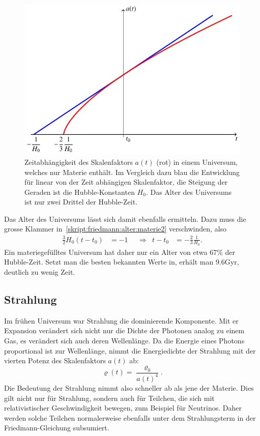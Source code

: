 \begin{figure}
\centering
\includegraphics{chapters/tikz/friedmann-materie.pdf}
\caption{Zeitabhängigkeit des Skalenfaktors $a(t)$ ({\color{red}rot})
in einem Universum, welches nur Materie enthält.
Im Vergleich dazu {\color{blue}blau} die Entwicklung für linear von der
Zeit abhängigen Skalenfaktor, die Steigung der Geraden ist die
Hubble-Konstanten $H_0$.
Das Alter des Universums ist nur zwei Drittel der Hubble-Zeit.
\label{skript:friedmann:graph:materie}}
\end{figure}

Das Alter des Universums lässt sich damit ebenfalls ermitteln.
Dazu muss die grosse Klammer in~\eqref{skript:friedmann:alter:materie2}
verschwinden, also
\begin{equation*}
\begin{aligned}
\frac32H_0(t-t_0)
&=
-1
&&\Rightarrow&
t-t_0
&=
-\frac23 \frac1{H_0}.
\end{aligned}
\end{equation*}
Ein materiegefülltes Universum hat daher nur ein Alter von
etwa 67\% der Hubble-Zeit. 
Setzt man die besten bekannten Werte in, erhält man 9.6Gyr,
deutlich zu wenig Zeit.

\subsection{Strahlung}
Im frühen Universum war Strahlung die dominierende Komponente.
Mit er Expansion verändert sich nicht nur die Dichte der Photonen 
analog zu einem Gas, es verändert sich auch deren Wellenlänge.
Da die Energie eines Photons proportional ist zur Wellenlänge,
nimmt die Energiedichte der Strahlung mit der vierten Potenz des
Skalenfaktors $a(t)$ ab:
\[
\varrho(t)=\frac{\varrho_0}{a(t)^4}.
\]
Die Bedeutung der Strahlung nimmt also schneller ab als jene der Materie.
Dies gilt nicht nur für Strahlung, sondern auch für Teilchen, die
sich mit relativistischer Geschwindigkeit bewegen, zum Beispiel für
Neutrinos.
Daher werden solche Teilchen normalerweise ebenfalls unter dem
Strahlungsterm in der Friedmann-Gleichung subsumiert.

